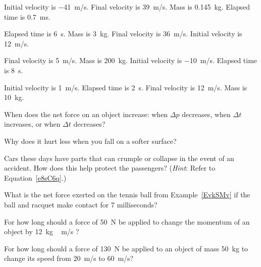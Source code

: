 \documentclass[main.tex]{subfiles}
\begin{document}
\begin{exercise} \label{LKi6tV}
    Initial velocity is \SI{-41}{m/s}. Final velocity is \SI{39}{m/s}. Mass is \SI{0.145}{kg}. Elapsed time is \SI{0.7}{ms}.
\end{exercise}

\begin{exercise} \label{uWU1Cn}
    Elapsed time is \SI{6}{s}. Mass is \SI{3}{kg}. Final velocity is \SI{36}{m/s}. Initial velocity is \SI{12}{m/s}.
\end{exercise}

\begin{exercise} \label{2doawd}
    Final velocity is \SI{5}{m/s}. Mass is \SI{200}{kg}. Initial velocity is \SI{-10}{m/s}.  Elapsed time is \SI{8}{s}.
\end{exercise}

\begin{exercise} \label{I7jORB}
    Initial velocity is \SI{1}{m/s}. Elapsed time is \SI{2}{s}. Final velocity is \SI{12}{m/s}.  Mass is \SI{10}{kg}.
\end{exercise}

\begin{exercise}
    When does the net force on an object increase: when $\Delta p$ decreases, when $\Delta t$ increases, or when $\Delta t$ decreases?
\end{exercise}

\begin{exercise}
    Why does it hurt less when you fall on a softer surface?
\end{exercise}

\begin{exercise}
    Cars these days have parts that can crumple or collapse in the event of an accident. How does this help protect the passengers? (\textit{Hint}: Refer to Equation~\ref{e8sC6q}.)
\end{exercise}

\begin{exercise} \label{e2TgS9}
    What is the net force exerted on the tennis ball from Example~\ref{EvkSMv} if the ball and racquet make contact for 7 milliseconds?
\end{exercise}

\begin{exercise} \label{2lAWwf}
    For how long should a force of \SI{50}{N}  be applied to change the momentum of an object by \SI{12}{kg\,m/s} ?
\end{exercise}

\begin{exercise} \label{6e43y6}
    For how long should a force of \SI{130}{N} be applied to an object of mass \SI{50}{kg} to change its speed from \SI{20}{m/s} to \SI{60}{m/s}?
\end{exercise}
\end{document}
